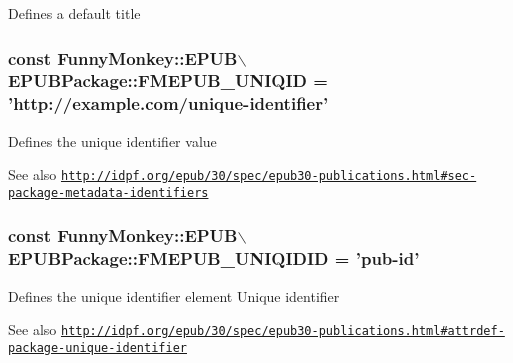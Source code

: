 \-Defines a default title \hypertarget{classFunnyMonkey_1_1EPUB_1_1EPUBPackage_aebf61188ec24076a27a500e854493bc6}{
\subsubsection[{\-F\-M\-E\-P\-U\-B\-\_\-\-U\-N\-I\-Q\-I\-D}]{\setlength{\rightskip}{0pt plus 5cm}const \-Funny\-Monkey\-::\-E\-P\-U\-B$\backslash${\bf \-E\-P\-U\-B\-Package\-::\-F\-M\-E\-P\-U\-B\-\_\-\-U\-N\-I\-Q\-I\-D} = 'http\-://example.\-com/unique-\/identifier'}}\label{classFunnyMonkey_1_1EPUB_1_1EPUBPackage_aebf61188ec24076a27a500e854493bc6}
\-Defines the unique identifier value \begin{DoxySeeAlso}{\-See also}
\href{http://idpf.org/epub/30/spec/epub30-publications.html#sec-package-metadata-identifiers}{\tt http\-://idpf.\-org/epub/30/spec/epub30-\/publications.\-html\#sec-\/package-\/metadata-\/identifiers} 
\end{DoxySeeAlso}
\hypertarget{classFunnyMonkey_1_1EPUB_1_1EPUBPackage_ab628985d9d179f80d0213f9792a81059}{
\subsubsection[{\-F\-M\-E\-P\-U\-B\-\_\-\-U\-N\-I\-Q\-I\-D\-I\-D}]{\setlength{\rightskip}{0pt plus 5cm}const \-Funny\-Monkey\-::\-E\-P\-U\-B$\backslash${\bf \-E\-P\-U\-B\-Package\-::\-F\-M\-E\-P\-U\-B\-\_\-\-U\-N\-I\-Q\-I\-D\-I\-D} = 'pub-\/id'}}\label{classFunnyMonkey_1_1EPUB_1_1EPUBPackage_ab628985d9d179f80d0213f9792a81059}
\-Defines the unique identifier element \-Unique identifier \begin{DoxySeeAlso}{\-See also}
\href{http://idpf.org/epub/30/spec/epub30-publications.html#attrdef-package-unique-identifier}{\tt http\-://idpf.\-org/epub/30/spec/epub30-\/publications.\-html\#attrdef-\/package-\/unique-\/identifier} 
\end{DoxySeeAlso}
